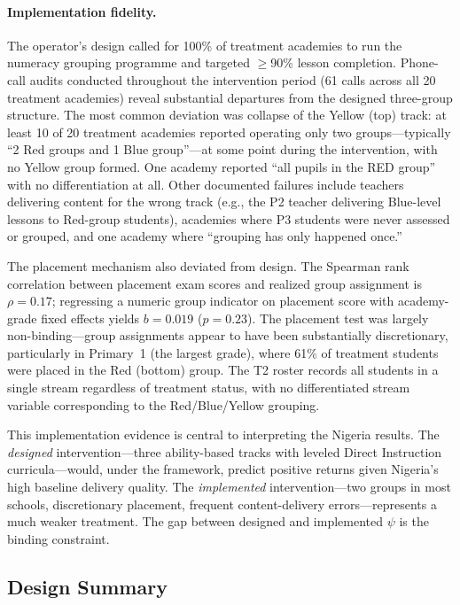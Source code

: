 \documentclass[11pt]{article}
\begin{document}
\paragraph{Implementation fidelity.} The operator's design called for 100\% of treatment academies to run the numeracy grouping programme and targeted $\geq$90\% lesson completion. Phone-call audits conducted throughout the intervention period (61 calls across all 20 treatment academies) reveal substantial departures from the designed three-group structure. The most common deviation was collapse of the Yellow (top) track: at least 10 of 20 treatment academies reported operating only two groups---typically ``2 Red groups and 1 Blue group''---at some point during the intervention, with no Yellow group formed. One academy reported ``all pupils in the RED group'' with no differentiation at all. Other documented failures include teachers delivering content for the wrong track (e.g., the P2 teacher delivering Blue-level lessons to Red-group students), academies where P3 students were never assessed or grouped, and one academy where ``grouping has only happened once.''

The placement mechanism also deviated from design. The Spearman rank correlation between placement exam scores and realized group assignment is $\rho = 0.17$; regressing a numeric group indicator on placement score with academy-grade fixed effects yields $b = 0.019$ ($p = 0.23$). The placement test was largely non-binding---group assignments appear to have been substantially discretionary, particularly in Primary~1 (the largest grade), where 61\% of treatment students were placed in the Red (bottom) group. The T2 roster records all students in a single stream regardless of treatment status, with no differentiated stream variable corresponding to the Red/Blue/Yellow grouping.

This implementation evidence is central to interpreting the Nigeria results. The \emph{designed} intervention---three ability-based tracks with leveled Direct Instruction curricula---would, under the framework, predict positive returns given Nigeria's high baseline delivery quality. The \emph{implemented} intervention---two groups in most schools, discretionary placement, frequent content-delivery errors---represents a much weaker treatment. The gap between designed and implemented $\psi$ is the binding constraint.

\subsection{Design Summary}
\end{document}
